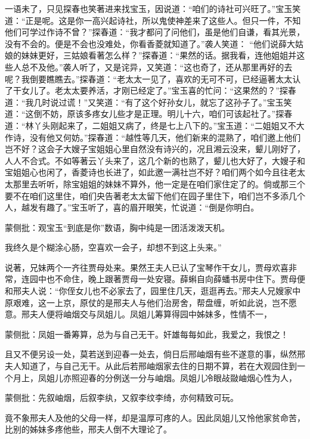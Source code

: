 \begin{parag}


    一语未了，只见探春也笑著进来找宝玉，因说道：“咱们的诗社可兴旺了。”宝玉笑道：“正是呢。这是你一高兴起诗社，所以鬼使神差来了这些人。但只一件，不知他们可学过作诗不曾？”探春道：“我才都问了问他们，虽是他们自谦，看其光景，没有不会的。便是不会也没难处，你看香菱就知道了。”袭人笑道： “他们说薛大姑娘的妹妹更好，三姑娘看著怎么样？”探春道：“果然的话。据我看，连他姐姐并这些人总不及他。”袭人听了，又是诧异，又笑道：“这也奇了，还从那里再好的去呢？我倒要瞧瞧去。”探春道：“老太太一见了，喜欢的无可不可，已经逼著太太认了干女儿了。老太太要养活，才刚已经定了。”宝玉喜的忙问：“这果然的？”探春道：“我几时说过谎！”又笑道：“有了这个好孙女儿，就忘了这孙子了。”宝玉笑道：“这倒不妨，原该多疼女儿些才是正理。明儿十六，咱们可该起社了。”探春道：“林丫头刚起来了，二姐姐又病了，终是七上八下的。”宝玉道：“二姐姐又不大作诗，没有他又何妨。”探春道：“越性等几天，他们新来的混熟了，咱们邀上他们岂不好？这会子大嫂子宝姐姐心里自然没有诗兴的，况且湘云没来，颦儿刚好了，人人不合式。不如等著云丫头来了，这几个新的也熟了，颦儿也大好了，大嫂子和宝姐姐心也闲了，香菱诗也长进了，如此邀一满社岂不好？咱们两个如今且往老太太那里去听听，除宝姐姐的妹妹不算外，他一定是在咱们家住定了的。倘或那三个要不在咱们这里住，咱们央告著老太太留下他们在园子里住下，咱们岂不多添几个人，越发有趣了。”宝玉听了，喜的眉开眼笑，忙说道：“倒是你明白。\begin{note}蒙侧批：观宝玉“到底是你”数语，胸中纯是一团活泼泼天机。\end{note}我终久是个糊涂心肠，空喜欢一会子，却想不到这上头来。”
\end{parag}


\begin{parag}


    说著，兄妹两个一齐往贾母处来。果然王夫人已认了宝琴作干女儿，贾母欢喜非常，连园中也不命住，晚上跟著贾母一处安寝。薛蝌自向薛蟠书房中住下。贾母便和邢夫人说：“你侄女儿也不必家去了，园里住几天，逛逛再去。”邢夫人兄嫂家中原艰难，这一上京，原仗的是邢夫人与他们治房舍，帮盘缠，听如此说，岂不愿意。邢夫人便将岫烟交与凤姐儿。凤姐儿筹算得园中姊妹多，性情不一，\begin{note}蒙侧批：凤姐一番筹算，总为与自己无干。奸雄每每如此，我爱之，我恨之！\end{note}且又不便另设一处，莫若送到迎春一处去，倘日后邢岫烟有些不遂意的事，纵然邢夫人知道了，与自己无干。从此后若邢岫烟家去住的日期不算，若在大观园住到一个月上，凤姐儿亦照迎春的分例送一分与岫烟。凤姐儿冷眼敁敠岫烟心性为人，\begin{note}蒙侧批：先叙岫烟，后叙李纨，又叙李纹李绮，亦何精致可玩。\end{note}竟不象邢夫人及他的父母一样，却是温厚可疼的人。因此凤姐儿又怜他家贫命苦，比别的姊妹多疼他些，邢夫人倒不大理论了。
\end{parag}


